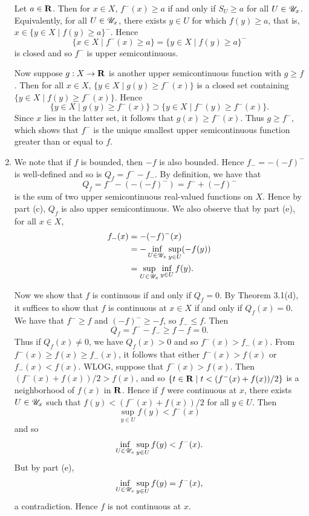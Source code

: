 \begin{prob}
\begin{enumerate}
Let $a \in \mathbf{R}$. Then for $x \in X$, $f^-(x) \geq a$ if and only if $S_U \geq a$ for all $U \in \mathscr{U}_x$. Equivalently, for all $U \in \mathscr{U}_x$, there exists $y \in U$ for which $f(y) \geq a$, that is, $x \in \{y \in X\mid f(y) \geq a\}^-$. Hence \[\{x \in X\mid f^-(x) \geq a\} = \{y \in X\mid f(y)\geq a\}^-\] is closed and so $f^-$ is upper semicontinuous.

Now suppose $g: X \to \mathbf{R}$ is another upper semicontinuous function with $g \geq f$. Then for all $x \in X$, $\{y \in X\mid g(y) \geq f^-(x)\}$ is a closed set containing $\{y \in X\mid f(y)\geq f^-(x)\}$. Hence \[\{y \in X\mid g(y) \geq f^-(x)\} \supset \{y \in X\mid f^-(y)\geq f^-(x)\}.\] Since $x$ lies in the latter set, it follows that $g(x) \geq f^-(x)$. Thus $g \geq f^-$, which shows that $f^-$ is the unique smallest upper semicontinuous function greater than or equal to $f$.

\item We note that if $f$ is bounded, then $-f$ is also bounded. Hence $f_- = -(-f)^-$ is well-defined and so is $Q_f = f^- - f_-$. By definition, we have that \[Q_f = f^- - (-(-f)^-) = f^- + (-f)^-\] is the sum of two upper semicontinuous real-valued functions on $X$. Hence by part (c), $Q_f$ is also upper semicontinuous. We also observe that by part (e), for all $x \in X$,
\begin{align*}
f_-(x) & = -(-f)^-(x)\\
& = -\inf_{U \in \mathscr{U}_x}\sup_{y \in U}(-f(y))\\
& = \sup_{U \in \mathscr{U}_x}\inf_{y \in U}f(y).
\end{align*}

Now we show that $f$ is continuous if and only if $Q_f = 0$. By Theorem 3.1(d), it suffices to show that $f$ is continuous at $x \in X$ if and only if $Q_f(x) = 0$. We have that $f^- \geq f$ and $(-f)^- \geq -f$, so $f_- \leq f$. Then \[Q_f = f^- - f_- \geq f - f = 0.\] Thus if $Q_f(x) \not = 0$, we have $Q_f(x) > 0$ and so $f^-(x) > f_-(x)$. From $f^-(x) \geq f(x) \geq f_-(x)$, it follows that either $f^-(x) > f(x)$ or $f_-(x) < f(x)$. WLOG, suppose that $f^-(x) > f(x)$. Then $(f^-(x) + f(x))/2 > f(x)$, and so $\{t \in \mathbf{R}\mid t < (f^-(x) + f(x))/2\}$ is a neighborhood of $f(x)$ in $\mathbf{R}$. Hence if $f$ were continuous at $x$, there exists $U \in \mathscr{U}_x$ such that $f(y) < (f^-(x) + f(x))/2$ for all $y \in U$. Then \[\sup_{y \in U}f(y) < f^-(x)\] and so \[\inf_{U \in \mathscr{U}_x}\sup_{y \in U}f(y) < f^-(x).\] But by part (e), \[\inf_{U \in \mathscr{U}_x}\sup_{y \in U}f(y) = f^-(x),\] a contradiction. Hence $f$ is not continuous at $x$. 


\end{enumerate}
\end{prob}
